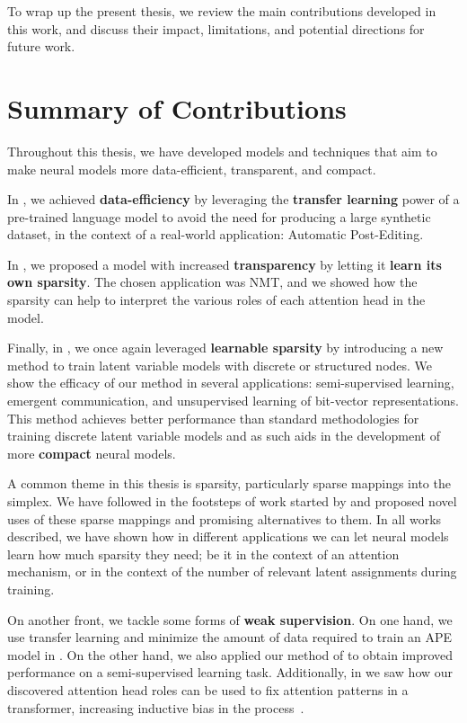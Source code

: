 \label{chap:conclusions}

\cleardoublepage
\doublespacing

\noindent To wrap up the present thesis, we review the main contributions
developed in this work, and discuss their impact, limitations, and
potential directions for future work.

\section{Summary of Contributions}

\noindent Throughout this thesis, we have developed models and
techniques that aim to make neural models more data-efficient, transparent,
and compact.

In , we achieved \textbf{data-efficiency} by
leveraging the \textbf{transfer learning} power of a pre-trained
language model to avoid the need for producing a large synthetic
dataset, in the context of a real-world application: Automatic
Post-Editing.

In , we proposed a model with increased
\textbf{transparency} by letting it \textbf{learn its own sparsity}.
The chosen application was NMT, and we showed
how the sparsity can help to interpret the various roles of each
attention head in the model.

Finally, in , we once again leveraged
\textbf{learnable sparsity} by introducing a new method to train
latent variable models with discrete or structured nodes. We show the
efficacy of our method in several applications: semi-supervised
learning, emergent communication, and unsupervised learning of
bit-vector representations. This method achieves better performance
than standard methodologies for training discrete latent variable
models and as such aids in the development of more \textbf{compact}
neural models.

A common theme in this thesis is sparsity, particularly
sparse mappings into the simplex. We have followed in the footsteps
of work started by \citet{sparsemax} and proposed novel uses of
these sparse mappings and promising alternatives to them.
In all works described, we have shown how in different applications
we can let neural models learn how much sparsity they need; be it
in the context of an attention mechanism, or in the context of
the number of relevant latent assignments during training.

On another front, we tackle some forms of \textbf{weak supervision}.
On one hand, we use transfer learning and minimize the amount of data
required to train an APE model in . On the other
hand, we also applied our method of  to
obtain improved performance on a semi-supervised learning task.
Additionally, in  we saw how our
discovered attention head roles can be used to fix attention patterns
in a transformer, increasing inductive bias in the
process~\citep{raganato2020FixedEncoderSelfAttention}.

